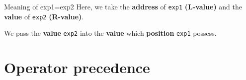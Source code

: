 \begin{Prop}{Meaning of exp1=exp2}{}
Here, we take the \textbf{address} of \verb|exp1| \textbf{(L-value)} and the \textbf{value} of \verb|exp2| \textbf{(R-value)}.

We pass the \textbf{value} \verb|exp2| into the \textbf{value} which \textbf{position} \verb|exp1| possess.
\end{Prop}


\section{Operator precedence} %
\label{sec:Operator precedence}


